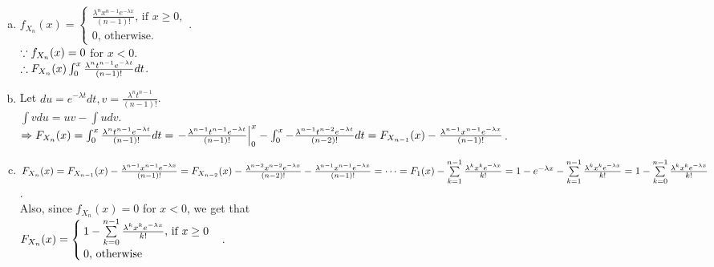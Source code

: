 \begin{pr}$ $
\begin{enumerate}[(a)]
\item $f_{X_n}(x)=\begin{cases}
\frac{\lambda^nx^{n-1}e^{-\lambda x}}{(n-1)!}\text{, if }x\geq0,\\
0\text{, otherwise.}
\end{cases}$.\\
$\because f_{X_n}(x)=0$ for $x<0$.\\
$\therefore F_{X_n}(x)\int_0^x\frac{\lambda^nt^{n-1}e^{-\lambda t}}{(n-1)!}dt$.
\item Let $du=e^{-\lambda t}dt, v=\frac{\lambda^nt^{n-1}}{(n-1)!}$.\\
$\int vdu=uv-\int udv$.\\
$\Rightarrow F_{X_n}(x)=\int_0^x\frac{\lambda^nt^{n-1}e^{-\lambda t}}{(n-1)!}dt=\left.-\frac{\lambda^{n-1}t^{n-1}e^{-\lambda t}}{(n-1)!}\right|_0^x-\int_0^x-\frac{\lambda^{n-1}t^{n-2}e^{-\lambda t}}{(n-2)!}dt=F_{X_{n-1}}(x)-\frac{\lambda^{n-1}x^{n-1}e^{-\lambda x}}{(n-1)!}$.
\item $F_{X_n}(x)=F_{X_{n-1}}(x)-\frac{\lambda^{n-1}x^{n-1}e^{-\lambda x}}{(n-1)!}=F_{X_{n-2}}(x)-\frac{\lambda^{n-2}x^{n-2}e^{-\lambda x}}{(n-2)!}-\frac{\lambda^{n-1}x^{n-1}e^{-\lambda x}}{(n-1)!}=\cdots=F_1(x)-\sum\limits_{k=1}^{n-1}\frac{\lambda^kx^ke^{-\lambda x}}{k!}=1-e^{-\lambda x}-\sum\limits_{k=1}^{n-1}\frac{\lambda^kx^ke^{-\lambda x}}{k!}=1-\sum\limits_{k=0}^{n-1}\frac{\lambda^kx^ke^{-\lambda x}}{k!}$.\\
Also, since $f_{X_n}(x)=0$ for $x<0$, we get that\\
$F_{X_n}(x)=\begin{cases}
1-\sum\limits_{k=0}^{n-1}\frac{\lambda^kx^ke^{-\lambda x}}{k!}\text{, if }x\geq0\\
0\text{, otherwise}
\end{cases}$.
\end{enumerate}
\end{pr}
